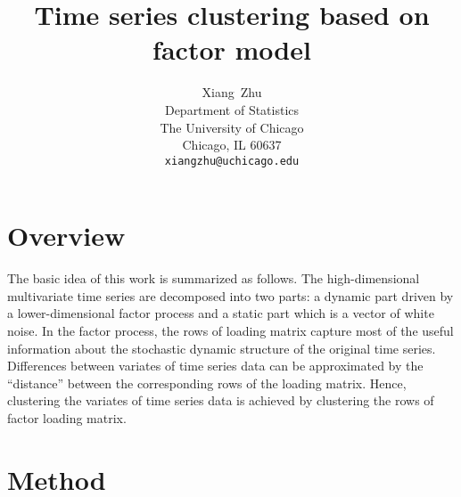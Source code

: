 \documentclass{article} %
\title{Time series clustering based on factor model}
\author{
Xiang~Zhu\\
Department of Statistics\\
The University of Chicago\\
Chicago, IL 60637\\
\texttt{xiangzhu@uchicago.edu} \\
}
\begin{document}
\maketitle


\section{Overview}
The basic idea of this work is summarized as follows. The high-dimensional multivariate time series are decomposed into two parts: a dynamic part driven by a lower-dimensional factor process and a static part which is a vector of white noise. In the factor process, the rows of loading matrix capture most of the useful information about the stochastic dynamic structure of the original time series. Differences between variates of time series data can be approximated by the ``distance'' between the corresponding rows of the loading matrix. Hence, clustering the variates of time series data is achieved by clustering the rows of factor loading matrix. 

\section{Method}
\end{document}
